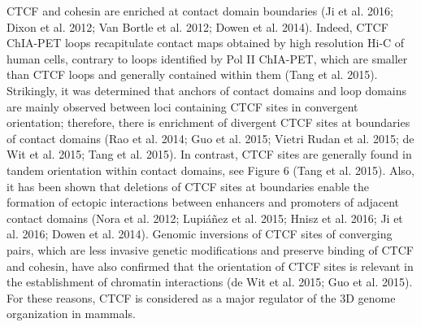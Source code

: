 CTCF and cohesin are enriched at contact domain boundaries (Ji et al. 2016; Dixon et al. 2012; Van Bortle et al. 2012; Dowen et al. 2014). Indeed, CTCF ChIA-PET loops recapitulate contact maps obtained by high resolution Hi-C of human cells, contrary to loops identified by Pol II ChIA-PET, which are smaller than CTCF loops and generally contained within them (Tang et al. 2015). Strikingly, it was determined that anchors of contact domains and loop domains are mainly observed between loci containing CTCF sites in convergent orientation; therefore, there is enrichment of divergent CTCF sites at boundaries of contact domains (Rao et al. 2014; Guo et al. 2015; Vietri Rudan et al. 2015; de Wit et al. 2015; Tang et al. 2015). In contrast, CTCF sites are generally found in tandem orientation within contact domains, see Figure 6 (Tang et al. 2015). Also, it has been shown that deletions of CTCF sites at boundaries enable the formation of ectopic interactions between enhancers and promoters of adjacent contact domains (Nora et al. 2012; Lupiáñez et al. 2015; Hnisz et al. 2016; Ji et al. 2016; Dowen et al. 2014). Genomic inversions of CTCF sites of converging pairs, which are less invasive genetic modifications and preserve binding of CTCF and cohesin, have also confirmed that the orientation of CTCF sites is relevant in the establishment of chromatin interactions (de Wit et al. 2015; Guo et al. 2015). For these reasons, CTCF is considered as a major regulator of the 3D genome organization in mammals.\\

